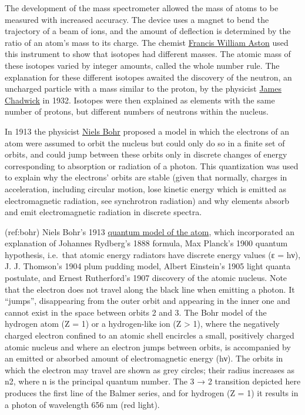 \documentclass[
]{article}
\begin{document}
The development of the mass spectrometer allowed the mass of atoms to be
measured with increased accuracy. The device uses a magnet to bend the
trajectory of a beam of ions, and the amount of deflection is determined
by the ratio of an atom's mass to its charge. The chemist
\href{https://en.wikipedia.org/wiki/Francis_William_Aston}{Francis
William Aston} used this instrument to show that isotopes had different
masses. The atomic mass of these isotopes varied by integer amounts,
called the whole number rule. The explanation for these different
isotopes awaited the discovery of the neutron, an uncharged particle
with a mass similar to the proton, by the physicist
\href{https://en.wikipedia.org/wiki/James_Chadwick}{James Chadwick} in
1932. Isotopes were then explained as elements with the same number of
protons, but different numbers of neutrons within the nucleus.

In 1913 the physicist
\href{https://en.wikipedia.org/wiki/Niels_Bohr}{Niels Bohr} proposed a
model in which the electrons of an atom were assumed to orbit the
nucleus but could only do so in a finite set of orbits, and could jump
between these orbits only in discrete changes of energy corresponding to
absorption or radiation of a photon. This quantization was used to
explain why the electrons' orbits are stable (given that normally,
charges in acceleration, including circular motion, lose kinetic energy
which is emitted as electromagnetic radiation, see synchrotron
radiation) and why elements absorb and emit electromagnetic radiation in
discrete spectra.

(ref:bohr) Niels Bohr's 1913
\href{https://en.wikipedia.org/wiki/Bohr_model\#/media/File:Bohr_atom_model.svg}{quantum
model of the atom}, which incorporated an explanation of Johannes
Rydberg's 1888 formula, Max Planck's 1900 quantum hypothesis, i.e.~that
atomic energy radiators have discrete energy values (ε = hν), J. J.
Thomson's 1904 plum pudding model, Albert Einstein's 1905 light quanta
postulate, and Ernest Rutherford's 1907 discovery of the atomic nucleus.
Note that the electron does not travel along the black line when
emitting a photon. It ``jumps'', disappearing from the outer orbit and
appearing in the inner one and cannot exist in the space between orbits
2 and 3. The Bohr model of the hydrogen atom (Z = 1) or a hydrogen-like
ion (Z \textgreater{} 1), where the negatively charged electron confined
to an atomic shell encircles a small, positively charged atomic nucleus
and where an electron jumps between orbits, is accompanied by an emitted
or absorbed amount of electromagnetic energy (hν). The orbits in which
the electron may travel are shown as grey circles; their radius
increases as n2, where n is the principal quantum number. The 3 → 2
transition depicted here produces the first line of the Balmer series,
and for hydrogen (Z = 1) it results in a photon of wavelength 656 nm
(red light).
\end{document}
